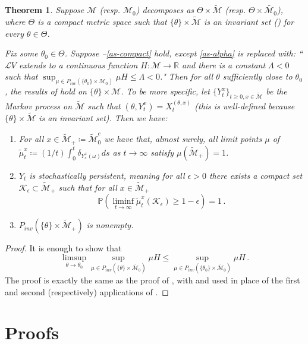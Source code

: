 \documentclass[final]{amsart}
\newtheorem{thm}{Theorem}
\numberwithin{thm}{section}
\numberwithin{equation}{section}
\newcommand{\Prb}{\mathbb{P}}
\newcommand{\mcM}{\mathcal{M}}
\newcommand{\R}{\mathbb{R}}
\newcommand{\tinv}{\tilde{\mathcal{M}}_+}
\newcommand{\K}{\mathcal{K}}
\newcommand{\Ll}{\mathcal{L}}
\begin{document}
\begin{thm}\label{robust}
    Suppose $\mcM$ (resp. $\mcM_0$) decomposes as $\Theta \times \tilde{\mcM}$ (resp. $\Theta \times \tilde{\mcM_0}$), where $\Theta$ is a compact metric space such that $\{\theta\} \times \tilde{\mcM}$ is an invariant set () for every $\theta \in \Theta$.
    
    Fix some $\theta_0 \in \Theta$. Suppose --\ref{as-compact} hold, except \ref{as-alpha} is replaced with: ``$\Ll V$ extends to a continuous function $H: \mcM \to \R$ and there is a constant $\Lambda < 0$ such that $\sup_{\mu \in P_{inv}(\{\theta_0\} \times \mcM_0)} \mu H \leq \Lambda < 0$." Then for all $\theta$ sufficiently close to $\theta_0$, the results of  hold on $\{\theta\} \times \mcM$. To be more specific, let $\{Y_t^x\}_{t \geq 0, x \in \tilde{\mcM}}$ be the Markov process on $\tilde{\mcM}$ such that $(\theta, Y_t^x) = X_t^{(\theta,x)}$ (this is well-defined because $\{\theta\} \times \tilde{\mcM}$ is an invariant set). Then we have:

    \begin{enumerate}[label=(\roman*)]
        \item For all $x \in \tinv \coloneqq \tilde{\mcM}_0^c$ we have that, almost surely, all limit points $\mu$ of $\tilde{\mu}_t^x \coloneqq (1/t)\int_0^t \delta_{Y_s^x(\omega)}ds$ as $t \to \infty$ satisfy $\mu(\tinv) = 1$.
        \item $Y_t$ is stochastically persistent, meaning for all $\epsilon > 0$ there exists a compact set $\K_\epsilon \subset \tinv$ such that for all $x \in \tinv$ $$\Prb(\liminf_{t \to \infty} \tilde{\mu}_t^x(\K_\epsilon) \geq 1 - \epsilon) = 1 \,.$$
        \item $P_{inv}(\{\theta\} \times \tinv)$ is nonempty.
    \end{enumerate}
\end{thm}

\begin{proof}
It is enough to show that $$\limsup_{\theta \to \theta_0} \sup_{ \mu \in P_{inv}(\{\theta\} \times \tilde{\mcM_0})} \mu H \leq \sup_{ \mu \in P_{inv}(\{\theta_0\} \times \tilde{\mcM_0})} \mu H \,.$$ The proof is exactly the same as the proof of \cite[Theorem 3.11]{extinction}, with  and  used in place of the first and second (respectively) applications of \cite[Lemma 2.22]{extinction}.
\end{proof}

\section{Proofs}\label{sec:proofs}
\end{document}
